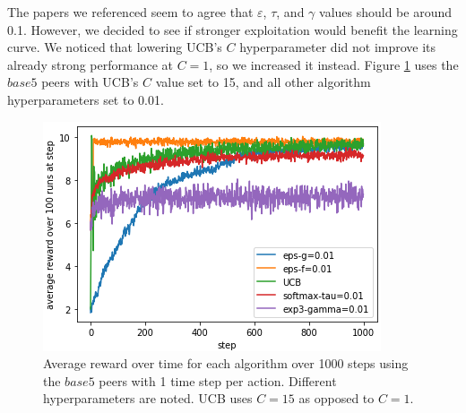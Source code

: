 \documentclass{article}
\begin{document}
The papers we referenced seem to agree that $\varepsilon$, $\tau$, and $\gamma$ values should be around 0.1. However, we decided to see if stronger exploitation would 
benefit the learning curve. We noticed that lowering UCB's $C$ hyperparameter did not improve its already strong performance at $C=1$, so we increased it instead. 
Figure \ref{fig:base5_hps_5algos} uses the $base5$ peers with UCB's $C$ value set to 15, and all other algorithm hyperparameters set to 0.01.
\begin{figure}[h]
    \centering
    \includegraphics[width=1\linewidth]{figs/base5_hps_0.01_UCB.png}
    \caption{Average reward over time for each algorithm over 1000 steps using the $base5$ peers with 1 time step per action. Different hyperparameters are noted. UCB 
    uses $C=15$ as opposed to $C=1$.}
    \label{fig:base5_hps_5algos}
\end{figure}
\end{document}
